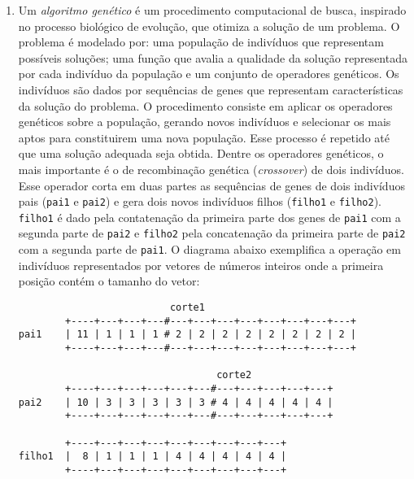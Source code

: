 \begin{enumerate}
\item Um \emph{algoritmo genético} é um procedimento computacional de busca,
inspirado no processo biológico de  evolução, que otimiza a solução de
um  pro\-ble\-ma.  O   problema é   modelado por: uma    população de
indivíduos que representam possíveis soluções; uma função que avalia a
qualidade da solução representada por cada indivíduo da população e um
conjunto  de operadores  genéticos.   Os   indivíduos  são dados   por
sequências   de genes que   representam características  da solução do
problema.  O procedimento consiste  em aplicar os operadores genéticos
sobre a população, gerando novos indivíduos e selecionar os mais aptos
para  constituirem uma  nova população.  Esse  processo é repetido até
que uma solução adequada seja obtida.  Dentre os operadores genéticos,
o mais importante é  o de recombinação genética  (\emph{crossover}) de
dois indivíduos.  Esse operador corta  em duas partes as sequências de
genes de dois indivíduos pais (\verb+pai1+  e \verb+pai2+) e gera dois
novos   indivíduos    filhos    (\verb+filho1+    e    \verb+filho2+).
\verb+filho1+ é dado pela contatenação da primeira  parte dos genes de
\verb+pai1+  com a segunda parte  de  \verb+pai2+ e \verb+filho2+ pela
concatenação  da primeira parte de \verb+pai2+  com a segunda parte de
\verb+pai1+.  O diagrama abaixo  exemplifica a operação  em indivíduos
representados por vetores de números inteiros  onde a primeira posição
contém o tamanho do vetor:
\vspace{-0.2cm}
\begin{center}
\begin{small}
\begin{verbatim}
                          corte1
        +----+---+---+---#---+---+---+---+---+---+---+---+
pai1    | 11 | 1 | 1 | 1 # 2 | 2 | 2 | 2 | 2 | 2 | 2 | 2 |
        +----+---+---+---#---+---+---+---+---+---+---+---+

                                  corte2
        +----+---+---+---+---+---#---+---+---+---+---+
pai2    | 10 | 3 | 3 | 3 | 3 | 3 # 4 | 4 | 4 | 4 | 4 |
        +----+---+---+---+---+---#---+---+---+---+---+

        +----+---+---+---+---+---+---+---+---+
filho1  |  8 | 1 | 1 | 1 | 4 | 4 | 4 | 4 | 4 |
        +----+---+---+---+---+---+---+---+---+


\end{verbatim}
\end{small}
\end{center}
\end{enumerate}
